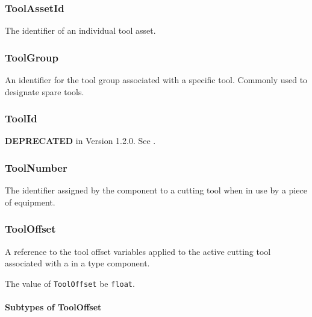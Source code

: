 \subsubsection{ToolAssetId}
\label{sec:ToolAssetId}



The identifier of an individual tool asset.



\subsubsection{ToolGroup}
\label{sec:ToolGroup}



An identifier for the tool group associated with a specific tool. Commonly used to designate spare tools.



\subsubsection{ToolId}
\label{sec:ToolId}



\textbf{DEPRECATED} in Version 1.2.0.   See . 



\subsubsection{ToolNumber}
\label{sec:ToolNumber}



The identifier assigned by the  component to a cutting tool when in use by a piece of equipment. 



\subsubsection{ToolOffset}
\label{sec:ToolOffset}



A reference to the tool offset variables applied to the active cutting tool associated with a  in a  type component.


The value of \texttt{ToolOffset} \MUST be \texttt{float}.


\paragraph{Subtypes of ToolOffset}\mbox{}
\label{sec:Subtypes of ToolOffset}


